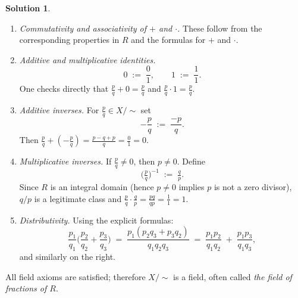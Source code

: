 \documentclass[12pt]{article}
\theoremstyle{definition} %
\newtheorem{solution}{Solution}
\theoremstyle{plain} %
\begin{document}
\begin{solution}
    \begin{enumerate}[label=\textbf{(\alph*)}]
      \item \emph{Commutativity and associativity of $+$ and $\cdot$.}  
            These follow from the corresponding properties in $R$ and the
            formulas for $+$ and $\cdot$.
      \item \emph{Additive and multiplicative identities.}
            \[
              0 \;:=\;\frac{0}{1}, 
              \qquad
              1 \;:=\;\frac{1}{1}.
            \]
            One checks directly that $\tfrac{p}{q}+0=\tfrac{p}{q}$ and
            $\tfrac{p}{q}\cdot1=\tfrac{p}{q}$.
      \item \emph{Additive inverses.}  
            For $\tfrac{p}{q}\in X/\!\sim$ set
            \[
                -\frac{p}{q}\;:=\;\frac{-p}{q}.
            \]
            Then
            $\tfrac{p}{q}+(-\tfrac{p}{q})=\tfrac{p-q+p}{q}=\tfrac{0}{1}=0$.
      \item \emph{Multiplicative inverses.}  
            If $\tfrac{p}{q}\neq 0$, then $p\neq0$.  
            Define
            \[
              \bigl(\tfrac{p}{q}\bigr)^{-1}\;:=\;\tfrac{q}{p}.
            \]
            Since $R$ is an integral domain (hence $p\neq0$ implies $p$ is not
            a zero divisor), $q/p$ is a legitimate class and
            $\tfrac{p}{q}\cdot\tfrac{q}{p}=\tfrac{pq}{qp}=\tfrac{1}{1}=1$.
      \item \emph{Distributivity.}  Using the explicit formulas:
            \[
              \frac{p_{1}}{q_{1}}\bigl(\frac{p_{2}}{q_{2}}+\frac{p_{3}}{q_{3}}\bigr)
              \;=\;
              \frac{p_{1}(p_{2}q_{3}+p_{3}q_{2})}{q_{1}q_{2}q_{3}}
              \;=\;
              \frac{p_{1}p_{2}}{q_{1}q_{2}}
              \;+\;
              \frac{p_{1}p_{3}}{q_{1}q_{3}},
            \]
            and similarly on the right.
    \end{enumerate}
    All field axioms are satisfied; therefore $X/\!\sim$ is a field, often
    called \emph{the field of fractions of $R$}.
    \end{solution}
\end{document}
